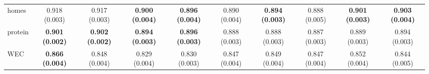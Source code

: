 \begin{table}[htbp]
{\begin{tabular}{lccccccccc}
homes & 0.918 (0.003) & 0.917 (0.003) & \textbf{0.900 (0.004)} & \textbf{0.896 (0.004)} & 0.890 (0.004) & \textbf{0.894 (0.003)} & 0.888 (0.005) & \textbf{0.901 (0.003)} & \textbf{0.903 (0.004)} \\
protein & \textbf{0.901 (0.002)} & \textbf{0.902 (0.002)} & \textbf{0.894 (0.003)} & \textbf{0.896 (0.003)} & 0.888 (0.003) & 0.888 (0.003) & 0.887 (0.003) & 0.889 (0.003) & 0.894 (0.003) \\
WEC & \textbf{0.866 (0.004)} & 0.848 (0.004) & 0.829 (0.004) & 0.830 (0.003) & 0.847 (0.004) & 0.849 (0.004) & 0.847 (0.004) & 0.852 (0.004) & 0.844 (0.005) \\
\bottomrule
\end{tabular}%
}
\end{table}
